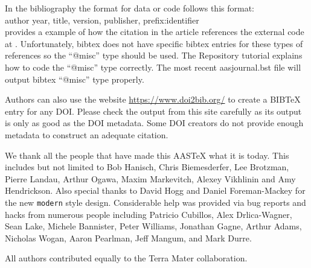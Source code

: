 \documentclass[linenumbers,trackchanges]{aastex7}
\begin{document}
In the bibliography the format for data or code follows this format: \\

\noindent author year, title, version, publisher, prefix:identifier\\

\citet{2015ApJ...805...23C} provides a example of how the citation in the
article references the external code at
.  Unfortunately, bibtex does
not have specific bibtex entries for these types of references so the
``@misc'' type should be used.  The Repository tutorial explains how to
code the ``@misc'' type correctly.  The most recent aasjournal.bst file
will output bibtex ``@misc'' type properly.

Authors can also use the website \url{https://www.doi2bib.org/} to create a BIBTeX entry for any DOI. Please check the output from this site carefully as its output is only as good as the DOI metadata. Some DOI creators do not provide enough metadata to construct an adequate citation.

\begin{acknowledgments}
We thank all the people that have made this AASTeX what it is today.  This
includes but not limited to Bob Hanisch, Chris Biemesderfer, Lee Brotzman,
Pierre Landau, Arthur Ogawa, Maxim Markevitch, Alexey Vikhlinin and Amy
Hendrickson. Also special thanks to David Hogg and Daniel Foreman-Mackey
for the new {\tt\string modern} style design. Considerable help was provided via bug
reports and hacks from numerous people including Patricio Cubillos, Alex
Drlica-Wagner, Sean Lake, Michele Bannister, Peter Williams, Jonathan
Gagne, Arthur Adams, Nicholas Wogan, Aaron Pearlman, Jeff Mangum, and Mark Durre.
\end{acknowledgments}

\begin{contribution}

All authors contributed equally to the Terra Mater collaboration.


\end{contribution}
\end{document}
